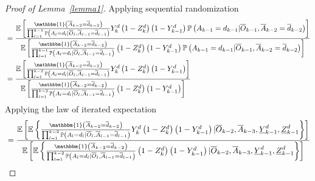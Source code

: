 \documentclass[12pt]{article}
\begin{document}
\begin{proof}[Proof of Lemma~\ref{lemma1}]
Applying sequential randomization
\begin{align*}
&=\frac{\mathbb{E} \left[ \frac{\mathbbm{1} \left( \overline{A}_{k-2} = \overline{d}_{k-2} \right) }{\prod_{l=1}^{k-1} \mathbb{P} \left(A_l = d_l \vert \overline{O}_l, \overline{A}_{l-1} = \overline{d}_{l-1} \right)} Y_{k}^d \left(1-Z_{k}^d \right) \left(1-Y_{k-1}^d \right) \mathbb{P} \left( A_{k-1} = d_{k-1} \vert  \overline{O}_{k-1}, \overline{A}_{k-2} = \overline{d}_{k-2} \right) \right]}{\mathbb{E} \left[ \frac{\mathbbm{1} \left( \overline{A}_{k-2} = \overline{d}_{k-2} \right)}{\prod_{l=1}^{k-1}  \mathbb{P} \left(A_l = d_l \vert \overline{O}_l, \overline{A}_{l-1} = \overline{d}_{l-1} \right)} \left(1-Z_{k}^d \right) \left(1-Y_{k-1}^d \right) \mathbb{P} \left( A_{k-1} = d_{k-1} \vert  \overline{O}_{k-1}, \overline{A}_{k-2} = \overline{d}_{k-2} \right) \right]} \\
&=\frac{\mathbb{E} \left[ \frac{\mathbbm{1} \left( \overline{A}_{k-2} = \overline{d}_{k-2} \right) }{\prod_{l=1}^{k-2}  \mathbb{P} \left(A_l = d_l \vert \overline{O}_l, \overline{A}_{l-1} = \overline{d}_{l-1} \right)} Y_{k}^d \left(1-Z_{k}^d \right) \left(1-Y_{k-1}^d \right) \right]}{\mathbb{E} \left[ \frac{\mathbbm{1} \left( \overline{A}_{k-2} = \overline{d}_{k-2} \right)}{\prod_{l=1}^{k-2}  \mathbb{P} \left(A_l = d_l \vert \overline{O}_l, \overline{A}_{l-1} = \overline{d}_{l-1} \right)} \left(1-Z_{k}^d \right) \left(1-Y_{k-1}^d \right) \right]} 
\end{align*}
Applying the law of iterated expectation
\begin{align*}
&=\frac{\mathbb{E} \left[ \mathbb{E} \left\lbrace \frac{\mathbbm{1} \left( \overline{A}_{k-2} = \overline{d}_{k-2} \right)}{\prod_{l=1}^{k-2}  \mathbb{P} \left(A_l = d_l \vert \overline{O}_l, \overline{A}_{l-1} = \overline{d}_{l-1} \right)} Y_{k}^d \left(1-Z_{k}^d \right) \left(1-Y_{k-1}^d \right) \vert  \overline{O}_{k-2}, \overline{A}_{k-3}, \underline{Y}_{k-1}^d, \underline{Z}_{k-1}^d \right\rbrace \right]}{\mathbb{E} \left[ \mathbb{E} \left\lbrace \frac{\mathbbm{1} \left( \overline{A}_{k-2} = \overline{d}_{k-2} \right)}{\prod_{l=1}^{k-2}  \mathbb{P} \left(A_l = d_l \vert \overline{O}_l, \overline{A}_{l-1} = \overline{d}_{l-1} \right)} \left(1-Z_{k}^d \right) \left(1-Y_{k-1}^d \right) \vert  \overline{O}_{k-2}, \overline{A}_{k-3}, \underline{Y}_{k-1}^d, \underline{Z}_{k-1}^d\right\rbrace \right]} \\

\end{align*}
\end{proof}
\end{document}
